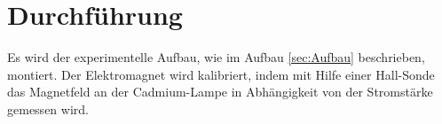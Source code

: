 
\section{Durchführung}
\label{sec:Durchführung}
Es wird der experimentelle Aufbau, wie im Aufbau \ref{sec:Aufbau} beschrieben, montiert. Der Elektromagnet wird kalibriert, indem mit Hilfe einer Hall-Sonde das Magnetfeld an der Cadmium-Lampe in Abhängigkeit von der Stromstärke gemessen wird. 
